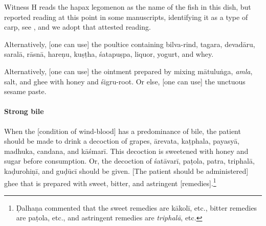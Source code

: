 \begin{translation}
{Witness H reads the hapax legomenon
 as the name of the fish in
this dish, but 
reported reading  at this
point in some manuscripts, identifying it as a
type of carp, see , and we
adopt that attested reading.}




Alternatively, [one can use] the poultice
containing
\gls{bilva}-rind,
\gls{tagara},
\gls{devadāru},
\gls{saralā},
\gls{rāsnā},
\gls{hareṇu},
\gls{kuṣṭha},
\gls{śatapuṣpa},
liquor, yogurt, and whey.

Alternatively,  [one can use] the ointment prepared by mixing
\gls{mātuluṅga}, \emph{amla}, %
salt, and ghee with honey and \gls{śigru}-root. Or else, [one can use]
the unctuous sesame paste. 


\paragraph{Strong bile}    

\item[8]

When the [condition of wind-blood] has a predominance of bile, the
patient should be made to drink a decoction of grapes, \gls{ārevata},
\gls{kaṭphala}, \gls{payasyā}, \gls{madhuka}, \gls{candana}, and
\gls{kāśmarī}. This decoction is sweetened with honey and sugar before
consumption. Or, the decoction of \gls{śatāvarī}, \gls{paṭola},
\gls{patra}, \gls{triphalā}, \gls{kaḍurohiṇī}, and \gls{guḍūcī} should
be given. [The patient should be administered] ghee that is prepared
with sweet, bitter, and astringent [remedies].\footnote{Ḍalhaṇa
    commented \citep[425]{vulgate} that the sweet remedies are
    \gls{kākolī}, etc., bitter remedies are \gls{paṭola}, etc., and
    astringent remedies are \textit{triphalā}, etc.}


\end{translation}

